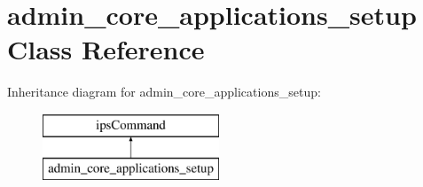 \hypertarget{classadmin__core__applications__setup}{\section{admin\-\_\-core\-\_\-applications\-\_\-setup Class Reference}
\label{classadmin__core__applications__setup}
}
Inheritance diagram for admin\-\_\-core\-\_\-applications\-\_\-setup\-:\begin{figure}[H]
\begin{center}
\leavevmode
\includegraphics[height=2.000000cm]{classadmin__core__applications__setup}
\end{center}
\end{figure}
